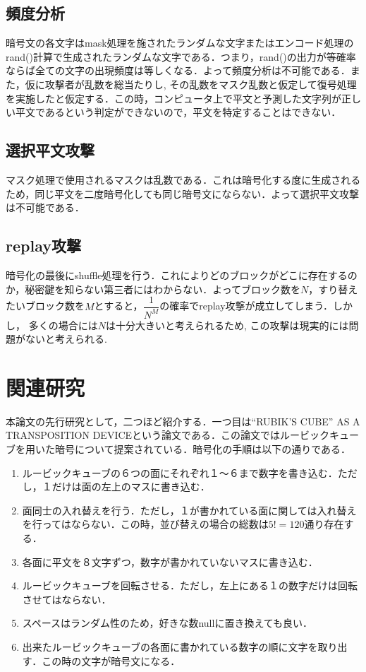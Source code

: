 \documentclass[titlepage]{jarticle}
\begin{document}
\subsection{頻度分析}
暗号文の各文字はmask処理を施されたランダムな文字またはエンコード処理のrand()計算で生成されたランダムな文字である．つまり，rand()の出力が等確率ならば全ての文字の出現頻度は等しくなる．よって頻度分析は不可能である．また，仮に攻撃者が乱数を総当たりし, その乱数をマスク乱数と仮定して復号処理を実施したと仮定する．この時，コンピュータ上で平文と予測した文字列が正しい平文であるという判定ができないので，平文を特定することはできない．
\subsection{選択平文攻撃}
マスク処理で使用されるマスクは乱数である．これは暗号化する度に生成されるため，同じ平文を二度暗号化しても同じ暗号文にならない．よって選択平文攻撃は不可能である．
\subsection{replay攻撃}
暗号化の最後にshuffle処理を行う．これによりどのブロックがどこに存在するのか，秘密鍵を知らない第三者にはわからない．よってブロック数を\(N\)，すり替えたいブロック数を\(M\)とすると，\(\dfrac{1}{N^M}\)の確率でreplay攻撃が成立してしまう．しかし， 多くの場合には\(N\)は十分大きいと考えられるため, この攻撃は現実的には問題がないと考えられる.

\section{関連研究}

本論文の先行研究として，二つほど紹介する．一つ目は“RUBIK'S CUBE” AS A TRANSPOSITION DEVICE\cite{Mitchell}という論文である．この論文ではルービックキューブを用いた暗号について提案されている．暗号化の手順は以下の通りである．
\begin{enumerate}
  \item ルービックキューブの６つの面にそれぞれ１〜６まで数字を書き込む．ただし，１だけは面の左上のマスに書き込む．
  \item 面同士の入れ替えを行う．ただし，１が書かれている面に関しては入れ替えを行ってはならない．この時，並び替えの場合の総数は\(5!=120\)通り存在する．
  \item 各面に平文を８文字ずつ，数字が書かれていないマスに書き込む．
  \item ルービックキューブを回転させる．ただし，左上にある１の数字だけは回転させてはならない．
  \item スペースはランダム性のため，好きな数nullに置き換えても良い．
  \item 出来たルービックキューブの各面に書かれている数字の順に文字を取り出す．この時の文字が暗号文になる．
\end{enumerate}
\end{document}
